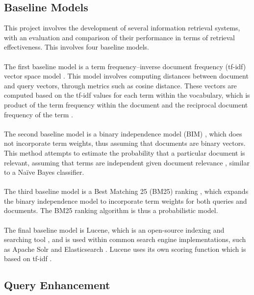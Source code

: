 \documentclass[conference]{IEEEtran}
\begin{document}
\subsection{Baseline Models}
This project involves the development of several information retrieval systems, with an evaluation and comparison of their performance in terms of retrieval effectiveness. This involves four baseline models.
\\\\
The first baseline model is a term frequency–inverse document frequency (tf-idf) vector space model \cite{salton1988term}. This model involves computing distances between document and query vectors, through metrics such as cosine distance. These vectors are computed based on the tf-idf values for each term within the vocabulary, which is product of the term frequency within the document and the reciprocal document frequency of the term \cite{salton1988term}. 
\\\\
The second baseline model is a binary independence model (BIM) \cite{yu1975precision}, which does not incorporate term weights, thus assuming that documents are binary vectors. This method attempts to estimate the probability that a particular document is relevant, assuming that terms are independent given document relevance \cite{yu1975precision}, similar to a Na\"ive Bayes classifier.
\\\\
The third baseline model is a Best Matching 25 (BM25) ranking \cite{robertson1995okapi}, which expands the binary independence model to incorporate term weights for both queries and documents. The BM25 ranking algorithm is thus a probabilistic model.
\\\\
The final baseline model is Lucene, which is an open-source indexing and searching tool \cite{bialecki2012apache}, and is used within common search engine implementations, such as Apache Solr \cite{grainger2014solr} and Elasticsearch \cite{divya2013elasticsearch}. Lucene uses its own scoring function which is based on tf-idf \cite{bialecki2012apache}.

\subsection{Query Enhancement}
\end{document}
